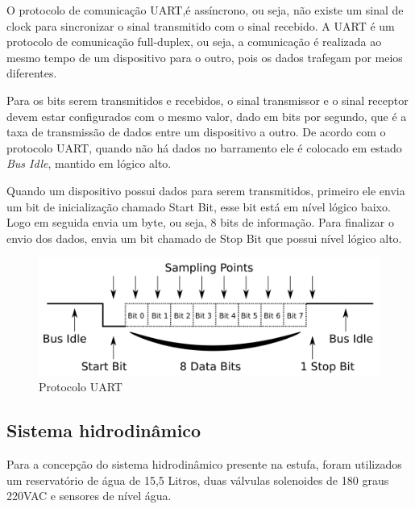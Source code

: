 O protocolo de comunicação UART,é  assíncrono, ou seja, não existe um sinal de clock para sincronizar o sinal transmitido com o sinal recebido. A UART é um protocolo de comunicação full-duplex, ou seja, a comunicação é realizada ao mesmo tempo de um dispositivo para o outro, pois os dados trafegam por meios diferentes. \cite{UART}

Para os bits serem transmitidos e recebidos,  o sinal transmissor e o sinal receptor devem estar configurados com o mesmo valor, dado em bits por segundo, que é a taxa de transmissão de dados entre um dispositivo a outro. De acordo com o protocolo UART, quando não há dados no barramento ele é colocado em estado \textit{Bus Idle}, mantido em lógico alto.

Quando um dispositivo possui dados para serem transmitidos, primeiro ele envia um bit de inicialização chamado Start Bit, esse bit está em nível lógico baixo. Logo em seguida envia um byte, ou seja, 8 bits de informação. Para finalizar o envio dos dados, envia um bit chamado de Stop Bit que possui nível lógico alto. \cite{UART}

\begin{figure}[!htb]
	\centering
	\includegraphics[scale=0.5]{figuras/10.png} 
	\caption{Protocolo UART}
	\label{Rotulo}
\end{figure}

\subsection{Sistema hidrodinâmico}
Para a concepção do sistema hidrodinâmico presente na estufa, foram utilizados um reservatório de água de 15,5 Litros, duas válvulas solenoides de 180 graus 220VAC e sensores de nível água.

